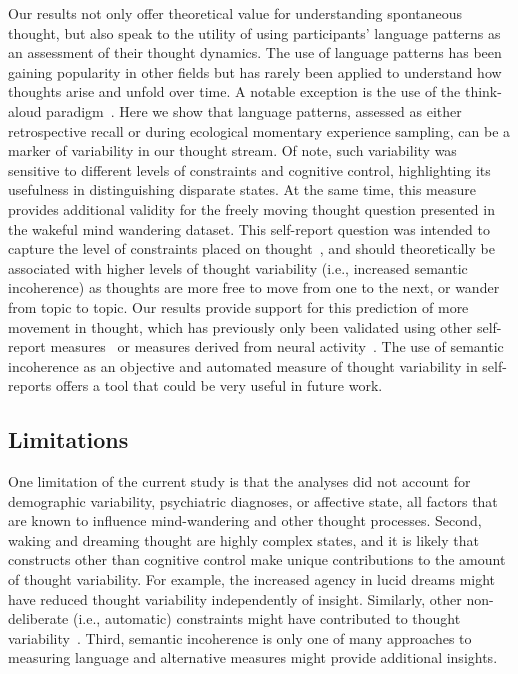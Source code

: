 \documentclass[10pt,a4paper,twocolumn]{article}
\begin{document}
\par
Our results not only offer theoretical value for understanding spontaneous thought, but also speak to the utility of using participants' language patterns as an assessment of their thought dynamics. The use of language patterns has been gaining popularity in other fields but has rarely been applied to understand how thoughts arise and unfold over time. A notable exception is the use of the think-aloud paradigm~\cite{raffaelli2021,sripada2020}. Here we show that language patterns, assessed as either retrospective recall or during ecological momentary experience sampling, can be a marker of variability in our thought stream. Of note, such variability was sensitive to different levels of constraints and cognitive control, highlighting its usefulness in distinguishing disparate states. At the same time, this measure provides additional validity for the freely moving thought question presented in the wakeful mind wandering dataset. This self-report question was intended to capture the level of constraints placed on thought~\cite{mills2021}, and should theoretically be associated with higher levels of thought variability (i.e., increased semantic incoherence) as thoughts are more free to move from one to the next, or wander from topic to topic. Our results provide support for this prediction of more movement in thought, which has previously only been validated using other self-report measures~\cite{mills2021} or measures derived from neural activity~\cite{kam2021}. The use of semantic incoherence as an objective and automated measure of thought variability in self-reports offers a tool that could be very useful in future work.

\subsection*{Limitations}
One limitation of the current study is that the analyses did not account for demographic variability, psychiatric diagnoses, or affective state, all factors that are known to influence mind-wandering and other thought processes. Second, waking and dreaming thought are highly complex states, and it is likely that constructs other than cognitive control make unique contributions to the amount of thought variability. For example, the increased agency in lucid dreams might have reduced thought variability independently of insight. Similarly, other non-deliberate (i.e., automatic) constraints might have contributed to thought variability~\cite{christoff2016}. Third, semantic incoherence is only one of many approaches to measuring language and alternative measures might provide additional insights.
\end{document}

